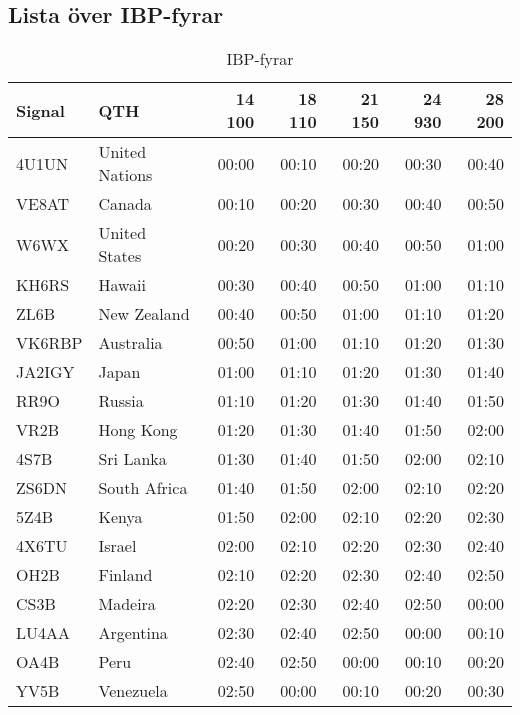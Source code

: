 \subsection{Lista över IBP-fyrar}

\begin{table}[H]
\centering
\begin{tabular}{llrrrrr}
\textbf{Signal} & \textbf{QTH} & \textbf{14 100} & \textbf{18 110} &
                \textbf{21 150} & \textbf{24 930} & \textbf{28 200} \\ \hline
4U1UN  & United Nations & 00:00  & 00:10  & 00:20  & 00:30  & 00:40  \\
VE8AT  & Canada         & 00:10  & 00:20  & 00:30  & 00:40  & 00:50  \\
W6WX   & United States  & 00:20  & 00:30  & 00:40  & 00:50  & 01:00  \\
KH6RS  & Hawaii         & 00:30  & 00:40  & 00:50  & 01:00  & 01:10  \\
ZL6B   & New Zealand    & 00:40  & 00:50  & 01:00  & 01:10  & 01:20  \\
VK6RBP & Australia      & 00:50  & 01:00  & 01:10  & 01:20  & 01:30  \\
JA2IGY & Japan          & 01:00  & 01:10  & 01:20  & 01:30  & 01:40  \\
RR9O   & Russia         & 01:10  & 01:20  & 01:30  & 01:40  & 01:50  \\
VR2B   & Hong Kong      & 01:20  & 01:30  & 01:40  & 01:50  & 02:00  \\
4S7B   & Sri Lanka      & 01:30  & 01:40  & 01:50  & 02:00  & 02:10  \\
ZS6DN  & South Africa   & 01:40  & 01:50  & 02:00  & 02:10  & 02:20  \\
5Z4B   & Kenya          & 01:50  & 02:00  & 02:10  & 02:20  & 02:30  \\
4X6TU  & Israel         & 02:00  & 02:10  & 02:20  & 02:30  & 02:40  \\
OH2B   & Finland        & 02:10  & 02:20  & 02:30  & 02:40  & 02:50  \\
CS3B   & Madeira        & 02:20  & 02:30  & 02:40  & 02:50  & 00:00  \\
LU4AA  & Argentina      & 02:30  & 02:40  & 02:50  & 00:00  & 00:10  \\
OA4B   & Peru           & 02:40  & 02:50  & 00:00  & 00:10  & 00:20  \\
YV5B   & Venezuela      & 02:50  & 00:00  & 00:10  & 00:20  & 00:30  \\
\end{tabular}
\caption{IBP-fyrar}
\end{table}

